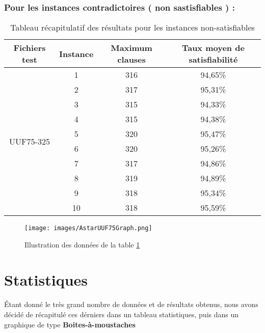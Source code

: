 \subsubsection{Pour les instances contradictoires ( non sastisfiables ) :  }
\begin{table}[H]
	\centering
\begin{tabular}{|c|c|c|c|}
	\hline
	Fichiers test               & Instance & Maximum clauses & Taux moyen de satisfiabilité \\ \hline
	\multirow{10}{*}{UUF75-325} & 1        & 316             & 94,65\%                      \\ \cline{2-4} 
	& 2        & 317             & 95,31\%                      \\ \cline{2-4} 
	& 3        & 315             & 94,33\%                      \\ \cline{2-4} 
	& 4        & 315             & 94,38\%                      \\ \cline{2-4} 
	& 5        & 320             & 95,47\%                      \\ \cline{2-4} 
	& 6        & 320             & 95,26\%                      \\ \cline{2-4} 
	& 7        & 317             & 94,86\%                      \\ \cline{2-4} 
	& 8        & 319             & 94,89\%                      \\ \cline{2-4} 
	& 9        & 318             & 95,34\%                      \\ \cline{2-4} 
	& 10       & 318             & 95,59\%                      \\ \hline
\end{tabular}
	\caption{Tableau récapitulatif des résultats pour les instances non-satisfiables}
	\label{table:Tab_Astar_Non_Sat}
\end{table}
\begin{figure}[H]
	\texttt{[image: images/AstarUUF75Graph.png]}
	\caption{Illustration des données de la table \ref{table:Tab_Astar_Non_Sat}}
\end{figure}
\newpage
\section{Statistiques}
\paragraph{}
Étant donné le très grand nombre de données et de résultats obtenus, nous avons décidé de récapitulé ces dérniers dans un tableau statistiques, puis dans un graphique de type \textbf{Boites-à-moustaches}

